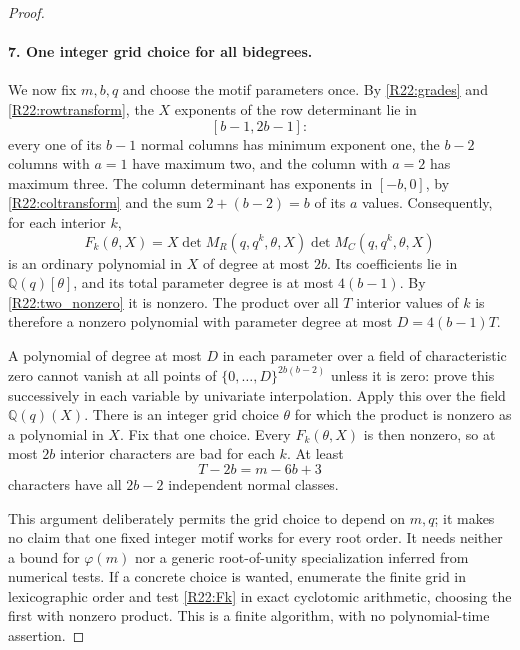 \begin{proof}
\paragraph{7. One integer grid choice for all bidegrees.}
We now fix $m,b,q$ and choose the motif parameters once.
By \eqref{R22:grades} and \eqref{R22:rowtransform}, the $X$ exponents
of the row determinant lie in
\[
 [b-1,2b-1]:
\]
every one of its $b-1$ normal columns has minimum exponent one,
the $b-2$ columns with $a=1$ have maximum two, and the column with
$a=2$ has maximum three. The column determinant has exponents in
$[-b,0]$, by \eqref{R22:coltransform} and the sum
$2+(b-2)=b$ of its $a$ values. Consequently, for each interior $k$,
\begin{equation}\label{R22:Fk}
 F_k(\theta,X)=X\det M_R(q,q^k,\theta,X)
                    \det M_C(q,q^k,\theta,X)
\end{equation}
is an ordinary polynomial in $X$ of degree at most $2b$.
Its coefficients lie in $\mathbb Q(q)[\theta]$, and its total
parameter degree is at most $4(b-1)$. By
\eqref{R22:two_nonzero} it is nonzero. The product over all $T$
interior values of $k$ is therefore a nonzero polynomial with
parameter degree at most $D=4(b-1)T$.

A polynomial of degree at most $D$ in each parameter over a field
of characteristic zero
cannot vanish at all points of $\{0,\ldots,D\}^{2b(b-2)}$ unless
it is zero: prove this successively in each variable by univariate
interpolation. Apply this over the field $\mathbb Q(q)(X)$.
There is an integer grid choice $\theta$ for which the product is
nonzero as a polynomial in $X$. Fix that one choice. Every
$F_k(\theta,X)$ is then nonzero, so at most $2b$ interior characters
are bad for each $k$. At least
\begin{equation}\label{R22:good_modes}
 T-2b=m-6b+3
\end{equation}
characters have all $2b-2$ independent normal classes.

This argument deliberately permits the grid choice to depend on
$m,q$; it makes no claim that one fixed integer motif works for
every root order. It needs neither a bound for $\varphi(m)$ nor a
generic root-of-unity specialization inferred from numerical tests.
If a concrete choice is wanted, enumerate the finite grid in
lexicographic order and test \eqref{R22:Fk} in exact cyclotomic
arithmetic, choosing the first with nonzero product. This is a finite
algorithm, with no polynomial-time assertion.


\end{proof}
